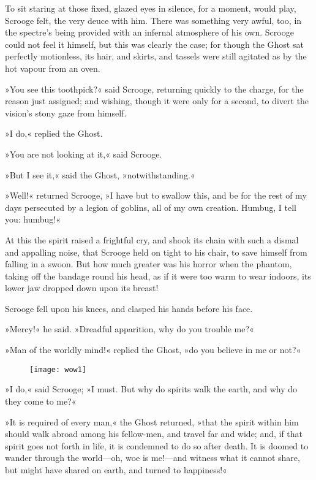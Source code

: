 To sit staring at those fixed, glazed eyes in silence, for a moment, would play, Scrooge felt, the very deuce with him. There was something very awful, too, in the spectre's being provided with an infernal atmosphere of his own. Scrooge could not feel it himself, but this was clearly the case; for though the Ghost sat perfectly motionless, its hair, and skirts, and tassels were still agitated as by the hot vapour from an oven.

»You see this toothpick?« said Scrooge, returning quickly to the charge, for the reason just assigned; and wishing, though it were only for a second, to divert the vision's stony gaze from himself.

»I do,« replied the Ghost.

»You are not looking at it,« said Scrooge.

»But I see it,« said the Ghost, »notwithstanding.«

»Well!« returned Scrooge, »I have but to swallow this, and be for the rest of my days persecuted by a legion of goblins, all of my own creation. Humbug, I tell you: humbug!«

At this the spirit raised a frightful cry, and shook its chain with such a dismal and appalling noise, that Scrooge held on tight to his chair, to save himself from falling in a swoon. But how much greater was his horror when the phantom, taking off the bandage round his head, as if it were too warm to wear indoors, its lower jaw dropped down upon its breast!

Scrooge fell upon his knees, and clasped his hands before his face.

»Mercy!« he said. »Dreadful apparition, why do you trouble me?«

»Man of the worldly mind!« replied the Ghost, »do you believe in me or not?«

\begin{figure}[t!]
\centering
\vfill
    \texttt{[image: wow1]}
    \vfill
\end{figure}

»I do,« said Scrooge; »I must. But why do spirits walk the earth, and why do they come to me?«

»It is required of every man,« the Ghost returned, »that the spirit within him should walk abroad among his fellow-men, and travel far and wide; and, if that spirit goes not forth in life, it is condemned to do so after death. It is doomed to wander through the world---oh, woe is me!---and witness what it cannot share, but might have shared on earth, and turned to happiness!«

